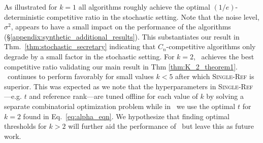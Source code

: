 As illustrated for $k=1$ all algorithms roughly achieve the optimal $(1/e)$-deterministic competitive ratio in the stochastic setting. Note that the noise level, $\sigma^2$, appears to have a small impact on the performance of the algorithms (\S\ref{appendix:synthetic_additional_results}). 
This substantiates our result in Thm.~\ref{thm:stochastic_secretary} indicating that $C_n$-competitive algorithms only degrade by a small factor in the stochastic setting. For $k=2$, \algoname\ achieves the best competitive ratio validating our main result in Thm \ref{thm:K_2_theorem1}. \algoname\ continues to perform favorably for small values $k<5$ after which \textsc{Single-Ref} is superior. 
This was expected as we note that the hyperparameters in \textsc{Single-Ref}---e.g. $t$ and reference rank---are tuned offline for each value of $k$ by solving a separate combinatorial optimization problem while in \algoname\ we use the optimal $t$ for $k=2$ found in Eq.~\ref{eq:alpha_eqn}. We hypothesize that finding optimal thresholds for $k>2$ will further aid the performance of \algoname\ but leave this as future work.